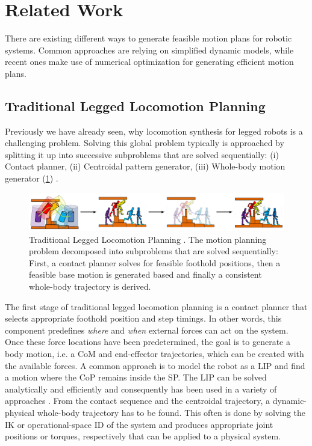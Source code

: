 \section{Related Work}\label{sec:IntroRelated}
There are existing different ways to generate feasible motion plans for robotic systems. Common approaches are relying on simplified dynamic models, while recent ones make use of numerical optimization for generating efficient motion plans. 

\subsection{Traditional Legged Locomotion Planning}
Previously we have already seen, why locomotion synthesis for legged robots is a challenging problem. Solving this global problem typically is approached by splitting it up into successive subproblems that are solved sequentially: (i) Contact planner, (ii) Centroidal pattern generator, (iii) Whole-body motion generator (\cref{img:traditional_locomotion_planner}) \cite{carpentier2017multi}. 

\begin{figure}
\centering	
\includegraphics[width=1\textwidth]{img/intro/traditional_locomotion_planner}
\caption[Traditional Legged Locomotion Planning]{Traditional Legged Locomotion Planning \cite{giraud2020motion}. The motion planning problem decomposed into subproblems that are solved sequentially: First, a contact planner solves for feasible foothold positions, then a feasible base motion is generated based and finally a consistent whole-body trajectory is derived.}
\label{img:traditional_locomotion_planner}
\end{figure} 
 
The first stage of traditional legged locomotion planning is a contact planner that selects appropriate foothold position and step timings. In other words, this component predefines \textit{where} and \textit{when} external forces can act on the system. 
Once these force locations have been predetermined, the goal is to generate a body motion, i.e. a \gls{CoM} and end-effector trajectories, which can be created with the available forces. A common approach is to model the robot as a \gls{LIP} and find a motion where the \gls{CoP} remains inside the \gls{SP}. The \gls{LIP} can be solved analytically and efficiently and consequently has been used in a variety of approaches \cite{kajita2003biped, kalakrishnan2010fast, winkler2015planning, bellicoso2017dynamic}. 
From the contact sequence and the centroidal trajectory, a dynamic-physical whole-body trajectory has to be found. This often is done by solving the \gls{IK} \cite{espiau1992new} or operational-space \gls{ID} \cite{khatib1987unified} of the system and produces appropriate joint positions or torques, respectively that can be applied to a physical system.


